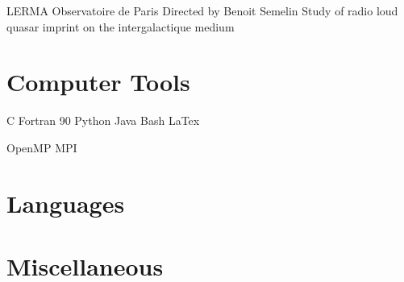 \documentclass{moderncv}
\begin{document}
{LERMA}
{Observatoire de Paris}
{Directed by Benoit Semelin}
{}
{Study of radio loud quasar imprint on the intergalactique medium}
  

\section{Computer Tools}
	 			{C}	{}	{ Fortran 90}
	\cvdoubleitem {}					{Python}		{} 	{Java}
	\cvdoubleitem {}					{Bash}	{}	{LaTex}
	 
   {OpenMP} {} {MPI}



\section{Languages}

\section{Miscellaneous}


                                                                  
\end{document}
